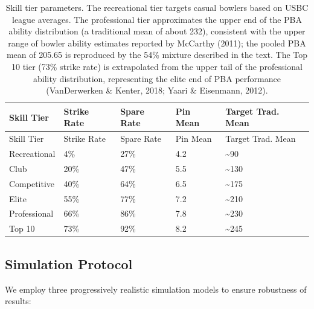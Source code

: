 \documentclass[
  letterpaper,
  DIV=11,
  numbers=noendperiod]{scrartcl}
\begin{document}
\begin{longtable}[]{@{}lllll@{}}
\caption{Skill tier parameters. The recreational tier targets casual
bowlers based on USBC league averages. The professional tier
approximates the upper end of the PBA ability distribution (a
traditional mean of about 232), consistent with the upper range of
bowler ability estimates reported by McCarthy (2011); the pooled PBA
mean of 205.65 is reproduced by the 54\% mixture described in the text.
The Top 10 tier (73\% strike rate) is extrapolated from the upper tail
of the professional ability distribution, representing the elite end of
PBA performance (VanDerwerken \& Kenter, 2018; Yaari \& Eisenmann,
2012).}\label{tbl-tiers}\tabularnewline
\toprule\noalign{}
Skill Tier & Strike Rate & Spare Rate & Pin Mean & Target Trad. Mean \\
\midrule\noalign{}
\endfirsthead
\toprule\noalign{}
Skill Tier & Strike Rate & Spare Rate & Pin Mean & Target Trad. Mean \\
\midrule\noalign{}
\endhead
\bottomrule\noalign{}
\endlastfoot
Recreational & 4\% & 27\% & 4.2 & \textasciitilde90 \\
Club & 20\% & 47\% & 5.5 & \textasciitilde130 \\
Competitive & 40\% & 64\% & 6.5 & \textasciitilde175 \\
Elite & 55\% & 77\% & 7.2 & \textasciitilde210 \\
Professional & 66\% & 86\% & 7.8 & \textasciitilde230 \\
Top 10 & 73\% & 92\% & 8.2 & \textasciitilde245 \\
\end{longtable}

\subsection{Simulation Protocol}\label{simulation-protocol}

We employ three progressively realistic simulation models to ensure
robustness of results:
\end{document}
